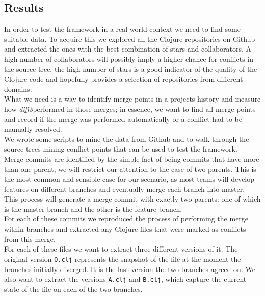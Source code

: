 \documentclass[11pt, titlepage]{article}
\newcommand{\diffthree}{\emph{diff3}}
\begin{document}

\subsection{Results}
In order to test the framework in a real world context we need to find some suitable data. To acquire this we explored all the Clojure repositories on Github and extracted the ones with the best combination of stars and collaborators. A high number of collaborators will possibly imply a higher chance for conflicts in the source tree, the high number of stars is a good indicator of the quality of the Clojure code and hopefully provides a selection of repositories from different domains.
\\
What we need is a way to identify merge points in a projects history and measure how \diffthree performed in those merges; in essence, we want to find all merge points and record if the merge was performed automatically or a conflict had to be manually resolved.
\\
We wrote some scripts to mine the data from Github and to walk through the source trees mining conflict points that can be used to test the framework. 
\\
Merge commits are identified by the simple fact of being commits that have more than one parent, we will restrict our attention to the case of two parents. This is the most common and sensible case for our scenario, as most teams will develop features on different branches and eventually merge each branch into master. 
This process will generate a merge commit with exactly two parents: one of which is the master branch and the other is the feature branch.
\\
For each of these commits we reproduced the process of performing the merge within branches and extracted any Clojure files that were marked as conflicts from this merge.
\\
For each of these files we want to extract three different versions of it. The original version \texttt{O.clj} represents the snapshot of the file at the moment the branches initially diverged. It is the last version the two branches agreed on. We also want to extract the versions \texttt{A.clj} and \texttt{B.clj}, which capture the current state of the file on each of the two branches.
\end{document}
